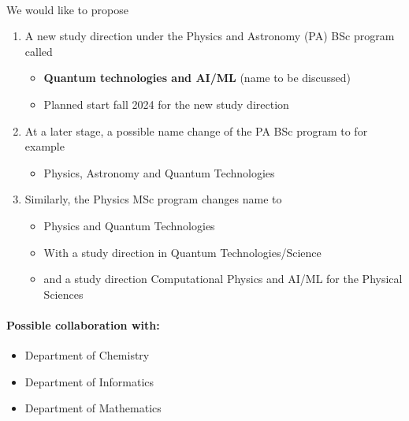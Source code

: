 \documentclass[%
oneside,                 %
final,                   %
10pt]{article}
\begin{document}
\paragraph{}
We would like to propose
\begin{enumerate}
\item A new study direction under the Physics and Astronomy (PA) BSc program called
\begin{itemize}

  \item \textbf{Quantum technologies and AI/ML} (name to be discussed)

  \item Planned start fall 2024 for the new study direction

\end{itemize}

\noindent
\item At a later stage, a possible name change of the PA BSc program to for example
\begin{itemize}

  \item Physics, Astronomy and Quantum Technologies

\end{itemize}

\noindent
\item Similarly, the Physics MSc program changes name to
\begin{itemize}

  \item Physics and Quantum Technologies

  \item With a study direction in Quantum Technologies/Science

  \item and a study direction Computational Physics and AI/ML for the Physical Sciences
\end{itemize}

\noindent
\end{enumerate}

\noindent




\paragraph{Possible collaboration with:}
\begin{itemize}
 \item Department of Chemistry

 \item Department of Informatics

 \item Department of Mathematics
\end{itemize}
\end{document}

